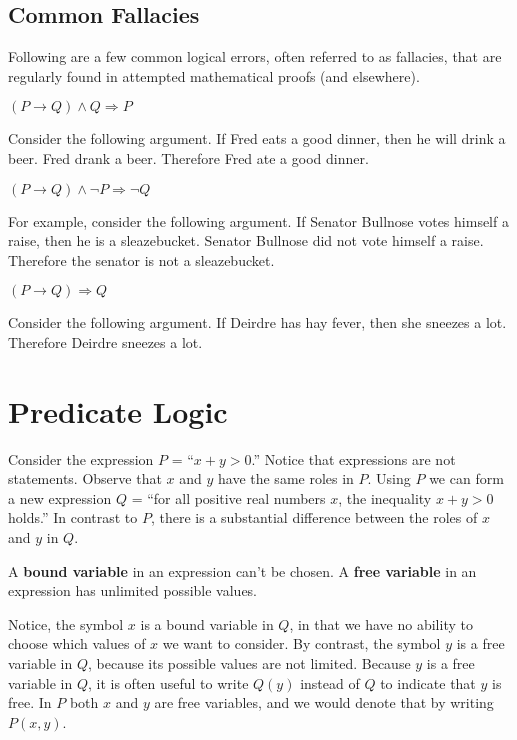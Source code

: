 \documentclass[]{article}
\begin{document}
\subsection{Common Fallacies}
Following are a few common logical errors, often referred to as fallacies, that are
regularly found in attempted mathematical proofs (and elsewhere).
\begin{defn} $(P\rightarrow Q) \wedge Q \Rightarrow P$
\end{defn}
\begin{exmp} Consider the following argument. If Fred eats a good dinner, then he will drink a beer. Fred drank a beer. Therefore Fred ate a good dinner.
\end{exmp}
\begin{defn} $(P \rightarrow Q) \wedge \neg P \Rightarrow \neg Q$
\end{defn}
\begin{exmp} For example, consider the following argument. If Senator Bullnose votes himself a raise, then he is a sleazebucket. Senator Bullnose did not vote himself a raise. Therefore the senator is not a sleazebucket.
\end{exmp}
\begin{defn} $(P \rightarrow Q) \Rightarrow Q$
\end{defn}
\begin{exmp} Consider the following argument. If Deirdre has hay fever, then she sneezes a lot. Therefore Deirdre sneezes a lot.
\end{exmp}

\section{Predicate Logic}
Consider the expression $P$ = ``$x+y > 0$.'' Notice that expressions are not statements. Observe that $x$ and $y$ have the same roles in $P$. Using $P$ we can form a new expression $Q$ = ``for all positive real numbers $x$, the inequality $x+y > 0$ holds.'' In contrast to $P$, there is a substantial difference between the roles of $x$ and $y$ in $Q$. 

\begin{defn}A \textbf{bound variable} in an expression can't be chosen. A \textbf{free variable} in an expression has unlimited possible values.
\end{defn}

Notice, the symbol $x$ is a bound variable in $Q$, in that we have no ability to choose which values of $x$ we want to consider. By contrast, the symbol $y$ is a free variable in $Q$, because its possible values are not limited. Because $y$ is a free variable in $Q$, it is often useful to write $Q(y)$ instead of $Q$ to indicate that $y$ is free. In $P$ both $x$ and $y$ are free variables, and we would denote that by writing $P(x,y)$.
\end{document}
